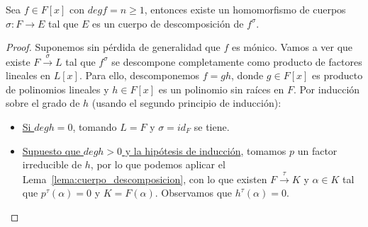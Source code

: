 \begin{prop}
    Sea $f\in F[x]$ con $degf = n \geq 1$, entonces existe un homomorfismo de cuerpos $\sigma:F\to E$ tal que $E$ es un cuerpo de descomposición de $f^{\sigma}$.
    \begin{proof}
        Suponemos sin pérdida de generalidad que $f$ es mónico. Vamos a ver que existe $F\stackrel{\sigma}{\to}L$ tal que $f^\sigma$ se descompone completamente como producto de factores lineales en $L[x]$. Para ello, descomponemos $f=gh$, donde $g\in F[x]$ es producto de polinomios lineales y $h\in F[x]$ es un polinomio sin raíces en $F$. Por inducción sobre el grado de $h$ (usando el segundo principio de inducción):
        \begin{itemize}
            \item \underline{Si $deg h = 0$}, tomando $L = F$ y $\sigma = id_F$ se tiene.
            \item \underline{Supuesto que $degh>0$ y la hipótesis de inducción}, tomamos $p$ un factor irreducible de $h$, por lo que podemos aplicar el Lema~\ref{lema:cuerpo_descomposicion}, con lo que existen $F\stackrel{\tau}{\to}K$ y $\alpha\in K$ tal que $p^\tau(\alpha)=0$ y $K = F(\alpha)$. Observamos que $h^\tau(\alpha)=0$.


\end{itemize}
\end{proof}
\end{prop}
